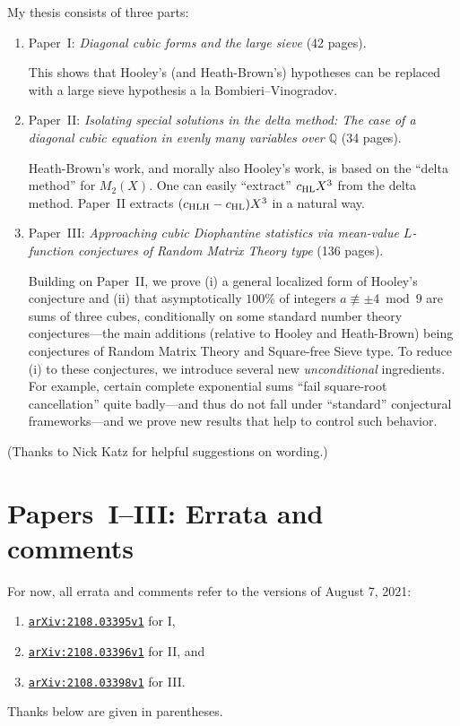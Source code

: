 \documentclass[12pt]{article}
\begin{document}
My thesis consists of three parts:
\begin{enumerate}
    \item Paper~I:
    \emph{Diagonal cubic forms and the large sieve}
    (42 pages).
    
    This shows that Hooley's (and Heath-Brown's) hypotheses can be replaced with
    a large sieve hypothesis a la Bombieri--Vinogradov.
    
    \item Paper~II:
    \emph{Isolating special solutions in the delta method:
    The case of a diagonal cubic equation in evenly many variables over $\mathbb{Q}$}
    (34 pages).
    
    Heath-Brown's work, and morally also Hooley's work, is based on the ``delta method'' for $M_2(X)$.
    One can easily ``extract'' $c_{\textnormal{HL}}X^3$ from the delta method.
    Paper~II extracts $(c_{\textnormal{HLH}}-c_{\textnormal{HL}})X^3$ in a natural way.
    
    \item Paper~III:
    \emph{Approaching cubic Diophantine statistics via mean-value $L$-function conjectures of Random Matrix Theory type}
    (136 pages).
    
    Building on Paper~II,
    we prove (i) a general localized form of Hooley's conjecture
    and (ii) that asymptotically $100\%$ of integers $a\not\equiv \pm4\bmod{9}$ are sums of three cubes,
    conditionally on some standard number theory conjectures---the main additions (relative to Hooley and Heath-Brown) being conjectures of Random Matrix Theory and Square-free Sieve type.
    To reduce (i) to these conjectures,
    we introduce several new \emph{unconditional} ingredients.
    For example, certain complete exponential sums ``fail square-root cancellation'' quite badly---and thus do not fall under ``standard'' conjectural frameworks---and we prove new results that help to control such behavior.
\end{enumerate}

(Thanks to Nick Katz for helpful suggestions on wording.)

\section{Papers~I--III: Errata and comments}

For now, all errata and comments refer to the versions of August 7, 2021:
\begin{enumerate}
    \item \href{https://arxiv.org/abs/2108.03395v1}{\texttt{arXiv:2108.03395v1}} for I,
    
    \item \href{https://arxiv.org/abs/2108.03396v1}{\texttt{arXiv:2108.03396v1}} for II,
    and
    
    \item \href{https://arxiv.org/abs/2108.03398v1}{\texttt{arXiv:2108.03398v1}} for III.
\end{enumerate}
Thanks below are given in parentheses.
\end{document}

